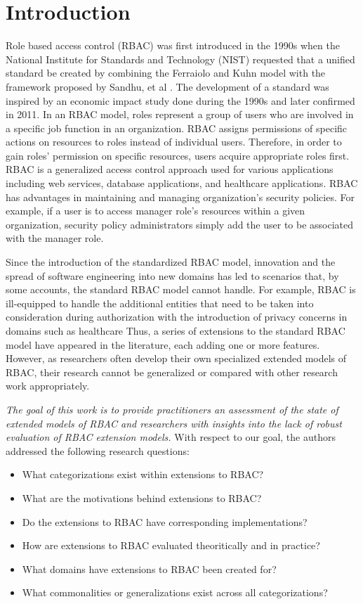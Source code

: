 \section{Introduction} \label{sec:introduction}

Role based access control (RBAC) was first introduced in the 1990s when the National Institute for Standards and Technology (NIST) requested that a unified standard be created by combining the Ferraiolo and Kuhn model \cite{ferraiolokuhn} with the framework proposed by Sandhu, et al \cite{sandhu1996role}.  The development of a standard was inspired by an economic impact study done during the 1990s and later confirmed in 2011. In an RBAC model, roles represent a group of users who are involved in a specific job function in an organization. RBAC assigns permissions of specific actions on resources to roles instead of individual users.  Therefore, in order to gain roles' permission on specific resources, users acquire appropriate roles first.  RBAC is a generalized access control approach used for various applications including web services, database applications, and healthcare applications.  RBAC has advantages in maintaining and managing organization's security policies.  For example, if a user is to access manager role's resources within a given organization, security policy administrators simply add the user to be associated with the manager role.

Since the introduction of the standardized RBAC model, innovation and the spread of software engineering into new domains has led to scenarios that, by some accounts, the standard RBAC model cannot handle.  For example, RBAC is ill-equipped to handle the additional entities that need to be taken into consideration during authorization with the introduction of privacy concerns in domains such as healthcare  Thus, a series of extensions to the standard RBAC model have appeared in the literature, each adding one or more features.  However, as researchers often develop their own specialized extended models of RBAC, their research cannot be generalized or compared with other research work appropriately.

\textit{The goal of this work is to provide practitioners an assessment of the state of extended models of RBAC and researchers with insights into the lack of robust evaluation of RBAC extension models.} With respect to our goal, the authors addressed the following research questions:

\begin{itemize}
\item What categorizations exist within extensions to RBAC?
\item What are the motivations behind extensions to RBAC?
\item Do the extensions to RBAC have corresponding implementations?
\item How are extensions to RBAC evaluated theoritically and in practice?
\item What domains have extensions to RBAC been created for?
\item What commonalities or generalizations exist across all categorizations?
\end{itemize}

